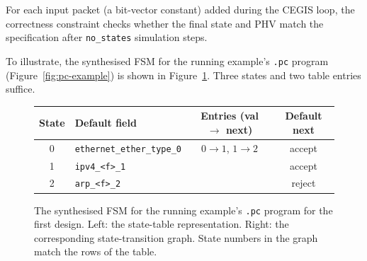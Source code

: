 For each input packet (a bit-vector constant) added during the CEGIS
loop, the correctness constraint checks whether the final state and PHV match
the specification after \texttt{no\_states} simulation steps.

To illustrate, the synthesised FSM for the running
example's \texttt{.pc} program (Figure~\ref{fig:pc-example}) is
shown in Figure~\ref{fig:running-stm-fd}. Three states and two
table entries suffice.

\begin{figure}[H]
\centering
\begin{minipage}{0.62\textwidth}
\centering
\footnotesize
\begin{tabular}{c l c c}
\hline
State & Default field & Entries (val $\to$ next) & Default next \\
\hline
0 & \texttt{ethernet\_ether\_type\_0} & $0 \to 1$, $1 \to 2$ & accept \\
1 & \texttt{ipv4\_<f>\_1}             &                       & accept \\
2 & \texttt{arp\_<f>\_2}              &                       & reject \\
\hline
\end{tabular}
\end{minipage}
\hfill
\begin{minipage}{0.32\textwidth}
\centering
{}
\end{minipage}
\caption{The synthesised FSM for the running example's
\texttt{.pc} program for the first design. Left: the state-table
representation. Right: the corresponding state-transition graph.
State numbers in the graph match the rows of the table.}
\label{fig:running-stm-fd}
\end{figure}

